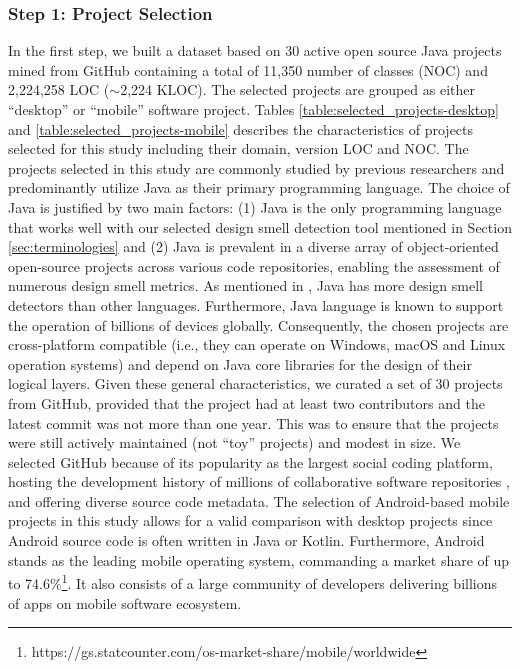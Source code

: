 \documentclass[AMA,Times1COL]{WileyNJDv5} %
\begin{document}
\subsubsection*{Step 1: Project Selection}
In the first step, we built a dataset based on 30 active open source Java projects mined from GitHub containing a total of 11,350 number of classes (NOC) and 2,224,258 LOC ($\sim$2,224 KLOC). The selected projects are grouped as either ``desktop'' or ``mobile'' software project. Tables \ref{table:selected_projects-desktop} and \ref{table:selected_projects-mobile} describes the characteristics of projects selected for this study including their domain, version LOC and NOC. The projects selected in this study are commonly studied by previous researchers and predominantly utilize Java as their primary programming language. The choice of Java is justified by two main factors: (1) Java is the only programming language that works well with our  selected design smell detection tool mentioned in Section \ref{sec:terminologies} and (2) Java is prevalent in a diverse array of object-oriented open-source projects across various code repositories, enabling the assessment of numerous design smell metrics. As mentioned in \cite{mannan2016understanding}, Java has more design smell detectors than other languages. Furthermore, Java language is known to support the operation of billions of devices globally. Consequently, the chosen projects are cross-platform compatible (i.e., they can operate on Windows, macOS and Linux operation systems) and depend on Java core libraries for the design of their logical layers. Given these general characteristics, we curated a set of 30 projects from GitHub, provided that the project had at least two contributors and the latest commit was not more than one year. This was to ensure that the projects were still actively maintained (not ``toy'' projects) and modest in size. We selected GitHub because of its popularity as the largest social coding platform, hosting the development history of millions of collaborative software repositories \cite{decan2022use}, and  offering diverse source code metadata.
The selection of Android-based mobile projects in this study allows for a valid comparison with desktop projects since Android source code is often written in Java or Kotlin. Furthermore, Android stands as the leading mobile operating system, commanding a market share of up to 74.6\%\footnote{https://gs.statcounter.com/os-market-share/mobile/worldwide}. It also consists of a large community of developers delivering billions of apps on mobile software ecosystem.
\end{document}
